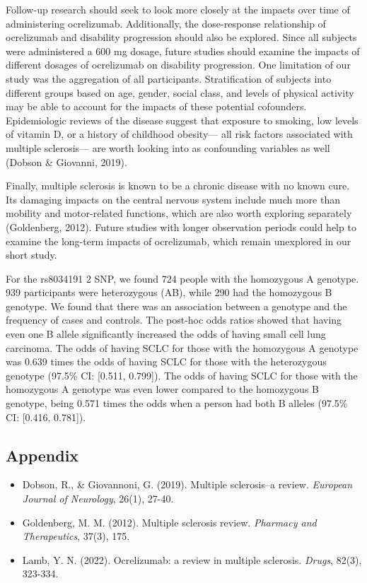 \documentclass{article}
\begin{document}
	Follow-up research should seek to look more closely at the impacts over time of administering ocrelizumab. Additionally, the dose-response relationship of ocrelizumab and disability progression should also be explored. Since all subjects were administered a 600 mg dosage, future studies should examine the impacts of different dosages of ocrelizumab on disability progression. One limitation of our study was the aggregation of all participants. Stratification of subjects into different groups based on age, gender, social class, and levels of physical activity may be able to account for the impacts of these potential cofounders. Epidemiologic reviews of the disease suggest that exposure to smoking, low levels of vitamin D, or a history of childhood obesity— all risk factors associated with multiple sclerosis— are worth looking into as confounding variables as well (Dobson \& Giovanni, 2019).

	Finally, multiple sclerosis is known to be a chronic disease with no known cure. Its damaging impacts on the central nervous system include much more than mobility and motor-related functions, which are also worth exploring separately (Goldenberg, 2012). Future studies with longer observation periods could help to examine the long-term impacts of ocrelizumab, which remain unexplored in our short study.

	For the rs8034191 2 SNP, we found 724 people with the homozygous A genotype. 939 participants were heterozygous (AB), while 290 had the homozygous B genotype. We found that there was an association between a genotype and the frequency of cases and controls. The post-hoc odds ratios showed that having even one B allele significantly increased the odds of having small cell lung carcinoma. The odds of having SCLC for those with the homozygous A genotype was 0.639 times the odds of having SCLC for those with the heterozygous genotype (97.5\% CI: [0.511, 0.799]). The odds of having SCLC for those with the homozygous A genotype was even lower compared to the homozygous B genotype, being 0.571 times the odds when a person had both B alleles (97.5\% CI: [0.416, 0.781]).


	\newpage
	\subsection*{Appendix}

	\begin{itemize}
		\item Dobson, R., \& Giovannoni, G. (2019). Multiple sclerosis–a review. \textit{European Journal of Neurology}, 26(1), 27-40.
		\item Goldenberg, M. M. (2012). Multiple sclerosis review. \textit{Pharmacy and Therapeutics}, 37(3), 175.
		\item Lamb, Y. N. (2022). Ocrelizumab: a review in multiple sclerosis. \textit{Drugs}, 82(3), 323-334.
	\end{itemize}
\end{document}
